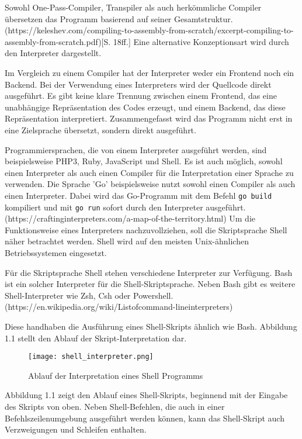 Sowohl One-Pass-Compiler, Transpiler als auch herkömmliche Compiler übersetzen das Programm basierend auf seiner Gesamtstruktur. (https://keleshev.com/compiling-to-assembly-from-scratch/excerpt-compiling-to-assembly-from-scratch.pdf)[S. 18ff.] Eine alternative Konzeptionsart wird durch den Interpreter dargestellt.


Im Vergleich zu einem Compiler hat der Interpreter weder ein Frontend noch ein Backend. Bei der Verwendung eines Interpreters wird der Quellcode direkt ausgeführt. Es gibt keine klare Trennung zwischen einem Frontend, das eine unabhängige Repräsentation des Codes erzeugt, und einem Backend, das diese Repräsentation interpretiert. Zusammengefasst wird das Programm nicht erst in eine Zielsprache übersetzt, sondern direkt ausgeführt.

Programmiersprachen, die von einem Interpreter ausgeführt werden, sind beispielsweise PHP3, Ruby, JavaScript und Shell. Es ist auch möglich, sowohl einen Interpreter als auch einen Compiler für die Interpretation einer Sprache zu verwenden. Die Sprache 'Go' beispielsweise nutzt sowohl einen Compiler als auch einen Interpreter. Dabei wird das Go-Programm mit dem Befehl \verb+go build+ kompiliert und mit \verb+go run+ sofort durch den Interpreter ausgeführt. (https://craftinginterpreters.com/a-map-of-the-territory.html)
Um die Funktionsweise eines Interpreters nachzuvollziehen, soll die Skriptsprache Shell näher betrachtet werden. Shell wird auf den meisten Unix-ähnlichen Betriebssystemen eingesetzt.
  
Für die Skriptsprache Shell stehen verschiedene Interpreter zur Verfügung. Bash ist ein solcher Interpreter für die Shell-Skriptsprache. Neben Bash gibt es weitere Shell-Interpreter wie Zsh, Csh oder Powershell. (https://en.wikipedia.org/wiki/Listofcommand-lineinterpreters)

Diese handhaben die Ausführung eines Shell-Skripts ähnlich wie Bash. Abbildung 1.1 stellt den Ablauf der Skript-Interpretation dar.
\begin{figure}[h]
  \centering
  \caption{Ablauf der Interpretation eines Shell Programms}
  \texttt{[image: shell\_interpreter.png]}
  \label{fig:shell}
\end{figure}
\pagebreak

Abbildung 1.1 zeigt den Ablauf eines Shell-Skripts, beginnend mit der Eingabe des Skripts von oben. Neben Shell-Befehlen, die auch in einer Befehlszeilenumgebung ausgeführt werden können, kann das Shell-Skript auch Verzweigungen und Schleifen enthalten.

